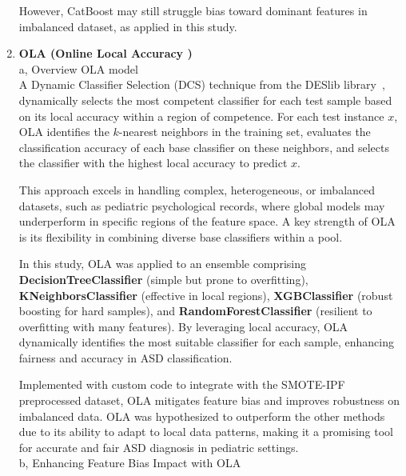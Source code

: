 \documentclass[conference]{IEEEtran}
\begin{document}
\begin{enumerate}
    However, CatBoost may still struggle bias toward dominant features in imbalanced dataset, as applied in this study.

    \item \textbf{OLA (Online Local Accuracy \cite{b16})} \\
    a, Overview OLA model\\

    A Dynamic Classifier Selection (DCS) technique from the DESlib library~\cite{b17}, dynamically selects the most competent classifier for each test sample based on its local accuracy within a region of competence. For each test instance $x$, OLA identifies the $k$-nearest neighbors in the training set, evaluates the classification accuracy of each base classifier on these neighbors, and selects the classifier with the highest local accuracy to predict $x$.

This approach excels in handling complex, heterogeneous, or imbalanced datasets, such as pediatric psychological records, where global models may underperform in specific regions of the feature space. A key strength of OLA is its flexibility in combining diverse base classifiers within a pool. 

In this study, OLA was applied to an ensemble comprising \textbf{DecisionTreeClassifier} (simple but prone to overfitting), \textbf{KNeighborsClassifier} (effective in local regions), \textbf{XGBClassifier} (robust boosting for hard samples), and \textbf{RandomForestClassifier} (resilient to overfitting with many features). By leveraging local accuracy, OLA dynamically identifies the most suitable classifier for each sample, enhancing fairness and accuracy in ASD classification.

Implemented with custom code to integrate with the SMOTE-IPF preprocessed dataset, OLA mitigates feature bias and improves robustness on imbalanced data. OLA was hypothesized to outperform the other methods due to its ability to adapt to local data patterns, making it a promising tool for accurate and fair ASD diagnosis in pediatric settings.\\

b, Enhancing Feature Bias Impact with OLA


\end{enumerate}
\end{document}
